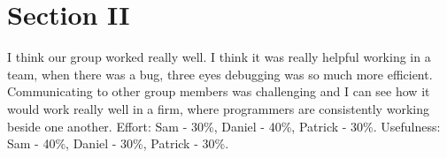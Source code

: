 \documentclass[12pt]{article} %
\begin{document}
\section{Section II}
I think our group worked really well. I think it was really helpful working in a team, when there was a bug, three eyes debugging was so much more efficient. Communicating to other group members was challenging and I can see how it would work really well in a firm, where programmers are consistently working beside one another. Effort: Sam - 30\%, Daniel - 40\%, Patrick - 30\%. Usefulness: Sam - 40\%, Daniel - 30\%, Patrick - 30\%.
\end{document}
